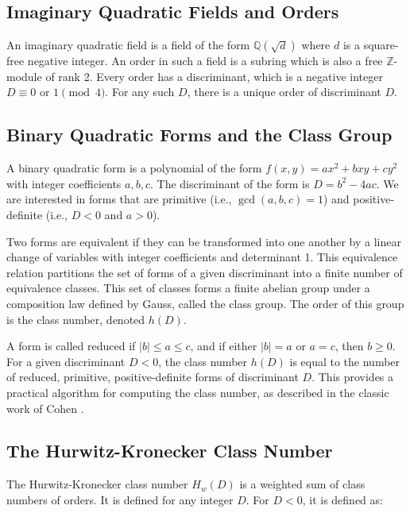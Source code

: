 \documentclass{article}
\begin{document}
\subsection{Imaginary Quadratic Fields and Orders}

An imaginary quadratic field is a field of the form $\mathbb{Q}(\sqrt{d})$ where $d$ is a square-free negative integer. An order in such a field is a subring which is also a free $\mathbb{Z}$-module of rank 2. Every order has a discriminant, which is a negative integer $D \equiv 0 \text{ or } 1 \pmod{4}$. For any such $D$, there is a unique order of discriminant $D$.

\subsection{Binary Quadratic Forms and the Class Group}

A binary quadratic form is a polynomial of the form $f(x, y) = ax^2 + bxy + cy^2$ with integer coefficients $a, b, c$. The discriminant of the form is $D = b^2 - 4ac$. We are interested in forms that are primitive (i.e., $\gcd(a, b, c) = 1$) and positive-definite (i.e., $D < 0$ and $a > 0$).

Two forms are equivalent if they can be transformed into one another by a linear change of variables with integer coefficients and determinant 1. This equivalence relation partitions the set of forms of a given discriminant into a finite number of equivalence classes. This set of classes forms a finite abelian group under a composition law defined by Gauss, called the class group. The order of this group is the class number, denoted $h(D)$.

A form is called reduced if $|b| \le a \le c$, and if either $|b| = a$ or $a = c$, then $b \ge 0$. For a given discriminant $D < 0$, the class number $h(D)$ is equal to the number of reduced, primitive, positive-definite forms of discriminant $D$. This provides a practical algorithm for computing the class number, as described in the classic work of Cohen \cite{cohen1993course}.

\subsection{The Hurwitz-Kronecker Class Number}

The Hurwitz-Kronecker class number $H_w(D)$ is a weighted sum of class numbers of orders. It is defined for any integer $D$. For $D < 0$, it is defined as:
\end{document}
